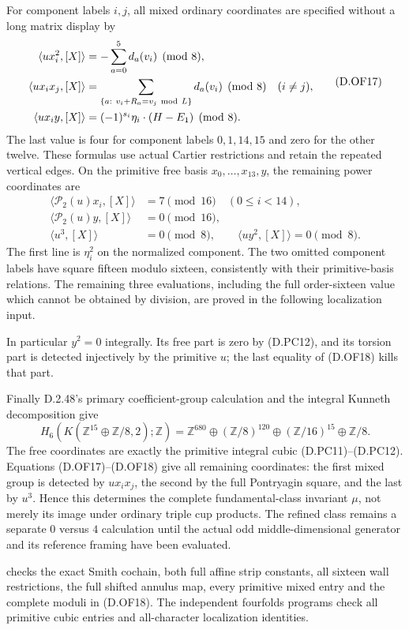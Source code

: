 For component labels \(i,j\), all mixed ordinary coordinates are
specified without a long matrix display by
\[
 \begin{aligned}
 \langle ux_i^2,[X]\rangle
                    &=-\sum_{a=0}^{5}d_a(v_i)\pmod8,\\
 \langle ux_ix_j,[X]\rangle
                    &=\sum_{\{a:\ v_i+R_a=v_j\ {\rm mod}\ L\}}
                                       d_a(v_i)\pmod8\quad(i\ne j),\\
 \langle ux_i y,[X]\rangle
                    &=(-1)^{s_i}\eta_i\cdot(H-E_1)\pmod8.
 \end{aligned}                                             \tag{D.OF17}
\]
The last value is four for component labels \(0,1,14,15\)
and zero for the other twelve. These formulas use actual
Cartier restrictions and retain the repeated vertical edges.
On the primitive free basis \(x_0,\ldots,x_{13},y\), the remaining
power coordinates are
\[
 \begin{split}
 \langle\mathcal P_2(u)x_i,[X]\rangle&=7\pmod{16}
                                             \quad(0\le i<14),\\
 \langle\mathcal P_2(u)y,[X]\rangle&=0\pmod{16},\\
 \langle u^3,[X]\rangle&=0\pmod8,\qquad
 \langle uy^2,[X]\rangle=0\pmod8.
 \end{split}                                               \tag{D.OF18}
\]
The first line is \(\eta_i^2\) on the normalized component.
The two omitted component labels have square fifteen modulo
sixteen, consistently with their primitive-basis relations.
The remaining three evaluations, including the full
order-sixteen value which cannot be obtained by division,
are proved in the following localization input.


In particular \(y^2=0\) integrally. Its free part is zero by
(D.PC12), and its torsion part is detected injectively by the
primitive \(u\); the last equality of (D.OF18) kills that part.

Finally D.2.48's primary coefficient-group calculation and
the integral Kunneth decomposition give
\[
 H_6(K(\mathbb Z^{15}\oplus\mathbb Z/8,2);\mathbb Z)
       =\mathbb Z^{680}\oplus(\mathbb Z/8)^{120}
                         \oplus(\mathbb Z/16)^{15}
                         \oplus\mathbb Z/8.              \tag{D.OF19}
\]
The free coordinates are exactly the primitive integral cubic
(D.PC11)--(D.PC12). Equations (D.OF17)--(D.OF18) give all
remaining coordinates: the first mixed group is detected by
\(ux_ix_j\), the second by the full Pontryagin square, and the
last by \(u^3\). Hence this determines the complete
fundamental-class invariant \(\mu\), not merely its image
under ordinary triple cup products.
The refined class remains a separate \(0\) versus \(4\)
calculation until the actual odd middle-dimensional generator
and its reference framing have been evaluated.

 checks the exact Smith
cochain, both full affine strip constants, all sixteen wall
restrictions, the full shifted annulus map, every primitive
mixed entry and the complete moduli in (D.OF18).
The independent fourfolds programs check all primitive cubic
entries and all-character localization identities.
